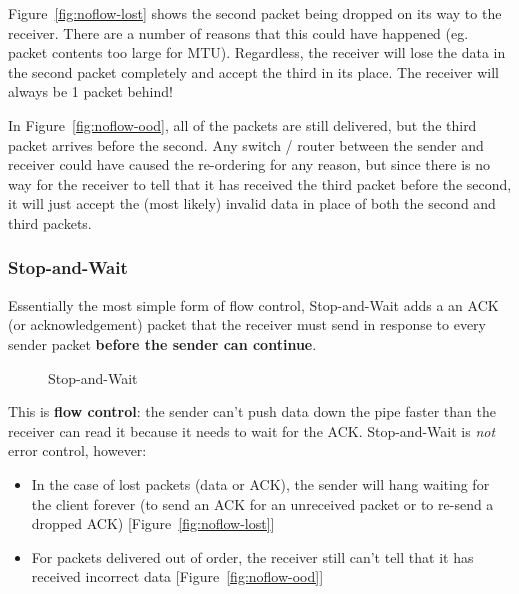 \documentclass[a4paper]{article}
\numberwithin{figure}{section}
\numberwithin{table}{section}
\begin{document}
Figure~\ref{fig:noflow-lost} shows the second packet being dropped on its way to the receiver. There are a number of reasons that this could have happened (eg. packet contents too large for MTU). Regardless, the receiver will lose the data in the second packet completely and accept the third in its place. The receiver will always be 1 packet behind!

In Figure~\ref{fig:noflow-ood}, all of the packets are still delivered, but the third packet arrives before the second. Any switch / router between the sender and receiver could have caused the re-ordering for any reason, but since there is no way for the receiver to tell that it has received the third packet before the second, it will just accept the (most likely) invalid data in place of both the second and third packets.

\subsubsection{Stop-and-Wait}
Essentially the most simple form of flow control, Stop-and-Wait adds a an ACK (or acknowledgement) packet that the receiver must send in response to every sender packet \textbf{before the sender can continue}.
\begin{figure}[h!]
	\centering
	\caption{Stop-and-Wait}
	\label{fig:saw-ok}
\end{figure}

This is \textbf{flow control}: the sender can't push data down the pipe faster than the receiver can read it because it needs to wait for the ACK. Stop-and-Wait is \textit{not} error control, however:
\begin{itemize}
	\item In the case of lost packets (data or ACK), the sender will hang waiting for the client forever (to send an ACK for an unreceived packet or to re-send a dropped ACK) [Figure~\ref{fig:noflow-lost}]
	\item For packets delivered out of order, the receiver still can't tell that it has received incorrect data [Figure~\ref{fig:noflow-ood}]
\end{itemize}
\end{document}
